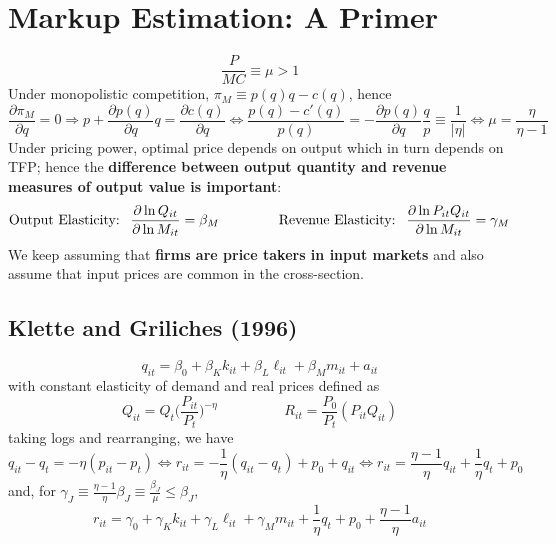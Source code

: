 \documentclass[11pt]{article}
\begin{document}
\section{Markup Estimation: A Primer}

\begin{equation}
	\frac{P}{MC} \equiv \mu > 1
\end{equation}
Under monopolistic competition, $\pi_M \equiv p(q)q - c(q)$, hence
\begin{equation}
	\frac{\partial \pi_M}{\partial q} = 0 \Rightarrow p + \frac{\partial p (q)}{\partial q}q = \frac{\partial c(q)}{\partial q} \Leftrightarrow \frac{p(q) - c'(q)}{p(q)} = - \frac{\partial p (q)}{\partial q}\frac{q}{p} \equiv \frac{1}{|\eta|} \Leftrightarrow \mu = \frac{\eta}{\eta - 1}
\end{equation}
Under pricing power, optimal price depends on output which in turn depends on TFP; hence the \textbf{difference between output quantity and revenue measures of output value is important}:
\begin{equation*}
	\text{Output Elasticity: }~ \frac{\partial \ln Q_{it}}{\partial \ln M_{it}} = \beta_M \hspace{1.5cm}
	\text{Revenue Elasticity: }~ \frac{\partial \ln P_{it}Q_{it}}{\partial \ln M_{it}} = \gamma_M
\end{equation*}
We keep assuming that \textbf{firms are price takers in input markets} and also assume that input prices are common in the cross-section.

\subsection{Klette and Griliches (1996)}

\begin{equation}
	q_{it} = \beta_0 + \beta_K k_{it} + \beta_L \ell_{it} + \beta_M m_{it} + a_{it}
\end{equation}
with constant elasticity of demand and real prices defined as
\begin{equation}
	Q_{it} = Q_t \big(\frac{P_{it}}{P_t}\big)^{-\eta} \hspace{2cm} R_{it} = \frac{P_0}{P_t}(P_{it}Q_{it})
\end{equation}
taking logs and rearranging, we have
\begin{equation}
	q_{it} - q_t = - \eta (p_{it} - p_t) \Leftrightarrow r_{it} = - \frac{1}{\eta}(q_{it} - q_t) + p_0 + q_{it} \Leftrightarrow r_{it} = \frac{\eta - 1}{\eta}q_{it} + \frac{1}{\eta} q_{t} + p_0
\end{equation}
and, for $\gamma_J \equiv \frac{\eta - 1}{\eta} \beta_J \equiv \frac{\beta_J}{\mu} \leq \beta_J$,
\begin{equation}
	r_{it} = \gamma_0 + \gamma_K k_{it} + \gamma_L \ell_{it} + \gamma_M m_{it} + \frac{1}{\eta} q_{t} + p_0 + \frac{\eta - 1}{\eta} a_{it}
\end{equation}
\end{document}
